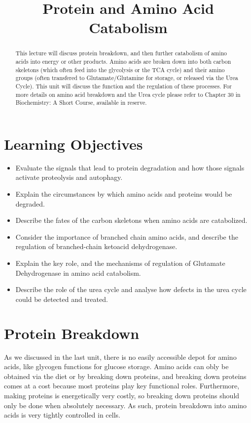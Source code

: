 \documentclass{tufte-handout}
\title{Protein and Amino Acid Catabolism}
\author{}
\date{}  %
\begin{document}
\maketitle%

\begin{abstract}
\noindent This lecture will discuss protein breakdown, and then further catabolism of amino acids into energy or other products.  Amino acids are broken down into both carbon skeletons (which often feed into the glycolysis or the TCA cycle) and their amino groups (often transfered to Glutamate/Glutamine for storage, or released via the Urea Cycle).  This unit will discuss the function and the regulation of these processes.  For more details on amino acid breakdown and the Urea cycle please refer to Chapter 30 in Biochemistry: A Short Course, available in reserve\cite{Berg2015}.
\end{abstract}

\tableofcontents

\pagebreak
\section{Learning Objectives}

\begin{itemize}
\item Evaluate the signals that lead to protein degradation and how those signals activate proteolysis and autophagy.
\item Explain the circumstances by which amino acids and proteins would be degraded.
\item Describe the fates of the carbon skeletons when amino acids are catabolized.
\item Consider the importance of branched chain amino acids, and describe the regulation of branched-chain ketoacid dehydrogenase.
\item Explain the key role, and the mechanisms of regulation of Glutamate Dehydrogenase in amino acid catabolism.
\item Describe the role of the urea cycle and analyse how defects in the urea cycle could be detected and treated.
\end{itemize}

\section{Protein Breakdown}

As we discussed in the last unit, there is no easily accessible depot for amino acids, like glycogen functions for glucose storage.  Amino acids can obly be obtained via the diet or by breaking down proteins, and breaking down proteins comes at a cost because most proteins play key functional roles.  Furthermore, making proteins is energetically very costly, so breaking down proteins should only be done when absolutely necessary.  As such, protein breakdown into amino acids is very tightly controlled in cells.
\end{document}
